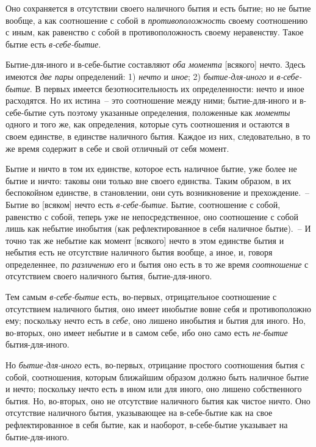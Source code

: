 Оно сохраняется в отсутствии своего наличного бытия
и есть бытие; но не бытие вообще, а как соотношение
с собой в \emph{противоположность} своему соотношению с иным,
как равенство с собой в противоположность своему неравенству.
Такое бытие есть \emph{в-себе-бытие}.

Бытие-для-иного и в-себе-бытие составляют \emph{оба момента}
[всякого] нечто. Здесь имеются \emph{две пары} определений:
1) \emph{нечто} и \emph{иное}; 2) \emph{бытие-для-иного} и \emph{в-себе-бытие}.
В первых имеется безотносительность их определенности:
нечто и иное расходятся. Но их истина~-- это соотношение
между ними; бытие-для-иного и в-себе-бытие
суть поэтому указанные определения, положенные как \emph{моменты}
одного и того же, как определения, которые суть
соотношения и остаются в своем единстве, в единстве наличного
бытия. Каждое из них, следовательно, в то же время
содержит в себе и свой отличный от себя момент.

Бытие и ничто в том их единстве, которое есть наличное
бытие, уже более не бытие и ничто: таковы они только
вне своего единства. Таким образом, в их беспокойном
единстве, в становлении, они суть возникновение и
прехождение.~-- Бытие во [всяком] нечто есть \emph{в-себе-бытие}.
Бытие, соотношение с собой, равенство с собой,
теперь уже не непосредственное, оно соотношение с собой
лишь как небытие инобытия (как рефлектированное
в себя наличное бытие).~-- И точно так же небытие как
момент [всякого] нечто в этом единстве бытия и небытия
есть не отсутствие наличного бытия вообще, а иное,
и, говоря определеннее, по \emph{различению} его и бытия оно
есть в то же время \emph{соотношение} с отсутствием своего
наличного бытия, бытие-для-иного.

Тем самым \emph{в-себе-бытие} есть, во-первых, отрицательное
соотношение с отсутствием наличного бытия, оно
имеет инобытие вовне себя и противоположно ему;
поскольку нечто есть в \emph{себе}, оно лишено инобытия и бытия
для иного. Но, во-вторых, оно имеет небытие и в самом
себе, ибо оно само есть \emph{не-бытие} бытия-для-иного.

Но \emph{бытие-для-иного} есть, во-первых, отрицание простого
соотношения бытия с собой, соотношения, которым
ближайшим образом должно быть наличное бытие и нечто;
поскольку нечто есть в ином или для иного, оно лишено
собственного бытия. Но, во-вторых, оно не отсутствие
наличного бытия как чистое ничто. Оно отсутствие
наличного бытия, указывающее на в-себе-бытие как на
свое рефлектированное в себя бытие, как и наоборот,
в-себе-бытие указывает на бытие-для-иного.

